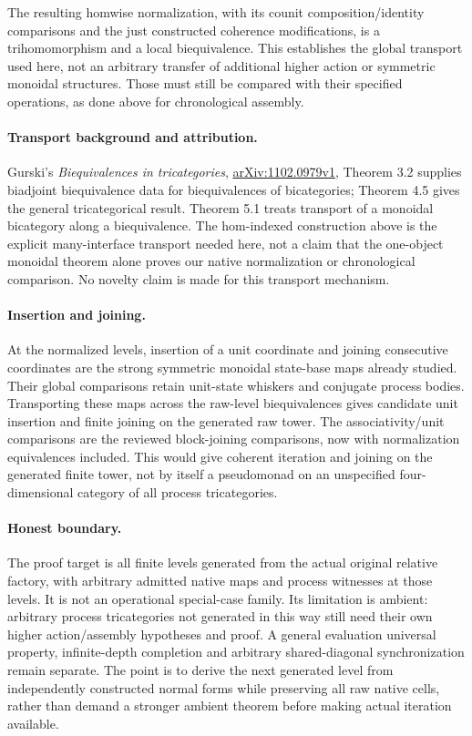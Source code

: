 \documentclass{article}
\begin{document}
The resulting homwise normalization, with its counit composition/identity comparisons and the just constructed coherence modifications, is a trihomomorphism and a local biequivalence. This establishes the global transport used here, not an arbitrary transfer of additional higher action or symmetric monoidal structures. Those must still be compared with their specified operations, as done above for chronological assembly.

\paragraph{Transport background and attribution.}
Gurski's \emph{Biequivalences in tricategories},
\href{https://arxiv.org/pdf/1102.0979v1}{arXiv:1102.0979v1},
Theorem 3.2 supplies biadjoint biequivalence data for biequivalences of bicategories; Theorem 4.5 gives the general tricategorical result. Theorem 5.1 treats transport of a monoidal bicategory along a biequivalence. The hom-indexed construction above is the explicit many-interface transport needed here, not a claim that the one-object monoidal theorem alone proves our native normalization or chronological comparison. No novelty claim is made for this transport mechanism.

\paragraph{Insertion and joining.} At the normalized levels, insertion of a unit coordinate and joining consecutive coordinates are the strong symmetric monoidal state-base maps already studied. Their global comparisons retain unit-state whiskers and conjugate process bodies. Transporting these maps across the raw-level biequivalences gives candidate unit insertion and finite joining on the generated raw tower. The associativity/unit comparisons are the reviewed block-joining comparisons, now with normalization equivalences included. This would give coherent iteration and joining on the generated finite tower, not by itself a pseudomonad on an unspecified four-dimensional category of all process tricategories.

\paragraph{Honest boundary.} The proof target is all finite levels generated from the actual original relative factory, with arbitrary admitted native maps and process witnesses at those levels. It is not an operational special-case family. Its limitation is ambient: arbitrary process tricategories not generated in this way still need their own higher action/assembly hypotheses and proof. A general evaluation universal property, infinite-depth completion and arbitrary shared-diagonal synchronization remain separate. The point is to derive the next generated level from independently constructed normal forms while preserving all raw native cells, rather than demand a stronger ambient theorem before making actual iteration available.
\end{document}
